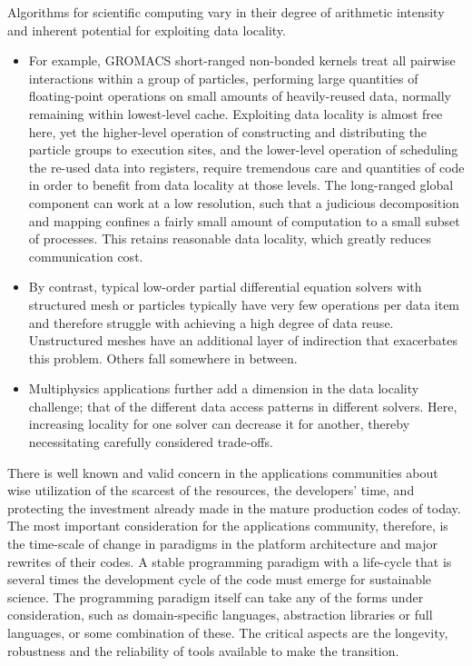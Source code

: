 Algorithms for scientific computing vary in their degree of
arithmetic intensity and inherent potential for exploiting data locality.
\begin{itemize}
\item For example, GROMACS short-ranged non-bonded kernels treat
all pairwise interactions within a group of particles, performing
large quantities of floating-point operations on small amounts of
heavily-reused data, normally remaining within lowest-level cache.
Exploiting data locality is almost free here, yet the higher-level
operation of constructing and distributing the particle groups
to execution sites, and the lower-level operation of scheduling
the re-used data into registers, require tremendous care and
quantities of code in order to benefit from data locality at those
levels.
The long-ranged global component can work at a low resolution,
such that a judicious decomposition and mapping confines
a fairly small amount of computation to a small subset
of processes. This retains reasonable data locality, which
greatly reduces communication cost.
\item By contrast, typical low-order partial
differential equation solvers with structured mesh or particles
typically have very few operations per data item and therefore
struggle with achieving a high degree of data reuse. Unstructured
meshes have an additional layer of indirection that exacerbates this
problem.  Others fall somewhere in between.
\item Multiphysics applications
further add a dimension  in  the data locality challenge; that of the
different data access patterns in different solvers. Here, increasing
locality for one solver can decrease it for another, thereby
necessitating carefully considered trade-offs.
\end{itemize}

There is well known
and valid concern in the applications communities about wise
utilization of the scarcest of the resources, the developers' time, and
protecting the investment already made in the mature production codes
of today. The most important consideration for the applications
community, therefore, is the time-scale of change in paradigms in the
platform architecture and major rewrites of their codes. A stable
programming paradigm with a life-cycle that is several times the
development cycle of the code must emerge for sustainable science. The
programming paradigm itself can take any of the forms under
consideration, such as domain-specific languages, abstraction
libraries or full languages, or some combination of these. The
critical aspects are the longevity, robustness and the reliability of
tools available to make the transition. 
 
